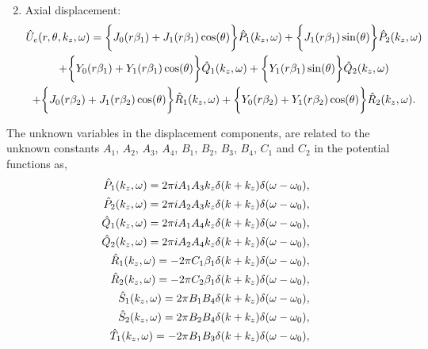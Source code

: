 \documentclass[11pt,cleanfoot]{asme2ej}
\begin{document}
\begin{enumerate}[label=(\alph*)]
\begin{multline}
    \end{multline}
    \item Axial displacement:
    \begin{multline}\label{Axial displacement 3d}    
    \Hat{U}_{e}(r,\theta,k_z,\omega) = \bigg\{J_{0}(r\beta_1) + J_{1}(r\beta_1)\cos(\theta)\bigg\}\Hat{P}_1(k_z,\omega) + \bigg\{J_{1}(r\beta_1)\sin(\theta)\bigg\}\Hat{P}_2(k_z,\omega)\\
    + \bigg\{Y_{0}(r\beta_1) + Y_{1}(r\beta_1)\cos(\theta)\bigg\}\Hat{Q}_1(k_z,\omega) + \bigg\{Y_{1}(r\beta_1)\sin(\theta)\bigg\}\Hat{Q}_2(k_z,\omega)\\
    + \bigg\{J_{0}(r\beta_2) + J_{1}(r\beta_2)\cos(\theta)\bigg\}\Hat{R}_1(k_z,\omega) + \bigg\{Y_{0}(r\beta_2) + Y_{1}(r\beta_2)\cos(\theta)\bigg\}\Hat{R}_2(k_z,\omega).
    \end{multline}    
\end{enumerate}
The unknown variables in the displacement components, are related to the unknown constants $A_1$, $A_2$, $A_3$, $A_4$, $B_1$, $B_2$, $B_3$, $B_4$, $C_1$ and $C_2$ in the potential functions as,
\begin{align}
    \Hat{P}_1(k_z,\omega) = 2\pi i A_1 A_3 k_z\delta(k+k_z)\delta(\omega-\omega_0)\label{P unknown with A},\\\Hat{P}_2(k_z,\omega) = 2\pi i A_2 A_3 k_z\delta(k+k_z)\delta(\omega-\omega_0),\\
    \Hat{Q}_1(k_z,\omega) = 2\pi i A_1 A_4 k_z\delta(k+k_z)\delta(\omega-\omega_0),\\\Hat{Q}_2(k_z,\omega) = 2\pi i A_2 A_4 k_z\delta(k+k_z)\delta(\omega-\omega_0),\\
    \Hat{R}_1(k_z,\omega) = -2\pi C_1\beta_1\delta(k+k_z)\delta(\omega-\omega_0),\\\Hat{R}_2(k_z,\omega) = -2\pi C_2\beta_1\delta(k+k_z)\delta(\omega-\omega_0),\\
    \Hat{S}_1(k_z,\omega) = 2\pi B_1 B_4\delta(k+k_z)\delta(\omega-\omega_0),\\ \Hat{S}_2(k_z,\omega) = 2\pi B_2 B_4\delta(k+k_z)\delta(\omega-\omega_0),\\
    \Hat{T}_1(k_z,\omega) = -2\pi B_1 B_3\delta(k+k_z)\delta(\omega-\omega_0),
\end{align}
\end{document}
